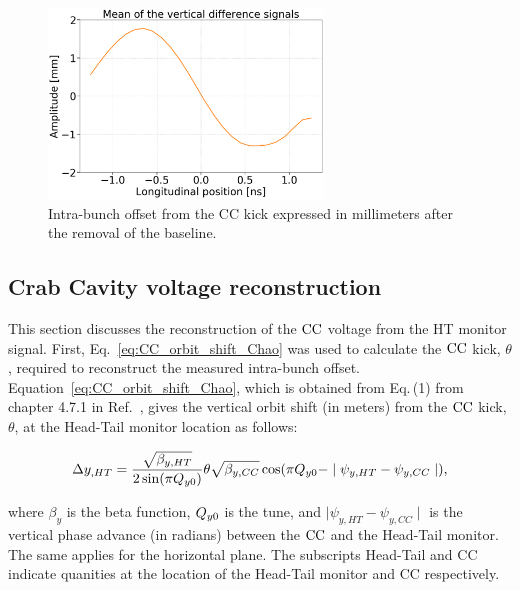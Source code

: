 \begin{figure}[!h]
   \centering         
   \includegraphics[width=0.65\textwidth]{images/Ch4/HT_corrected__20180530_135105_baseline_correction_new_version_CC_post_processing.png}
       \caption{Intra-bunch offset from the CC kick expressed in millimeters after the removal of the baseline.}
       \label{fig:HT_baseline_correction_crabbing_mm}
\end{figure}


 \subsection{Crab Cavity voltage reconstruction}\label{sec:Vcc_calibration}
 This section discusses the reconstruction of the ${\mathrm{CC}}$ voltage from the HT monitor signal. First, Eq.~\eqref{eq:CC_orbit_shift_Chao} was used to calculate the ${\mathrm{CC}}$ kick, $\theta$, required to reconstruct the measured intra-bunch offset. Equation~\eqref{eq:CC_orbit_shift_Chao}, which is obtained from Eq.\,(1) from chapter 4.7.1 in Ref.~\cite{Chao:1490001}, gives the vertical orbit shift (in meters) from the ${\mathrm{CC}}$ kick, $\theta$, at the Head-Tail monitor location as follows:

\begin{equation}\label{eq:CC_orbit_shift_Chao}
   \Delta y_{,HT} = \frac{\sqrt{\beta_{y, HT}}}{2 \sin(\pi {Q_{y0}})} \theta \sqrt{\beta_{y, CC}} \cos(\pi {Q_{y0}} - \mid \psi_{y, HT} - \psi_{y, CC} \mid),
\end{equation}

where $\beta_y$ is the beta function, ${Q_{y0}}$ is the tune, and $\mid \psi_{y, HT} - \psi_{y, CC} \mid$ is the vertical phase advance (in radians) between the ${\mathrm{CC}}$ and the Head-Tail monitor. The same applies for the horizontal plane. The subscripts Head-Tail and CC indicate quanities at the location of the Head-Tail monitor and CC respectively.

